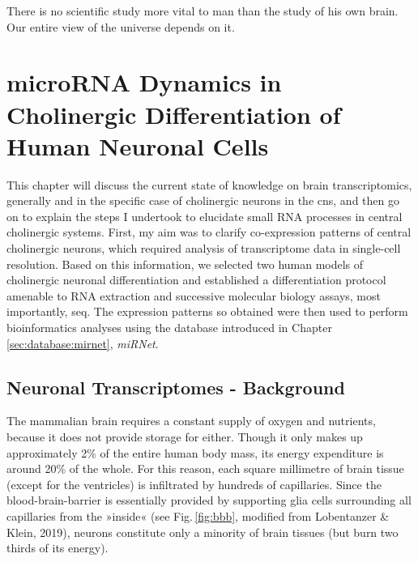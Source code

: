 \begin{savequote}[60mm]
There is no scientific study more vital to man than the study of his own brain. Our entire view of the universe depends on it.
\end{savequote}





\chapter{microRNA Dynamics in Cholinergic Differentiation of Human Neuronal Cells}
 This chapter will discuss the current state of knowledge on brain transcriptomics, generally and in the specific case of cholinergic neurons in the \ac{cns}, and then go on to explain the steps I undertook to elucidate small RNA processes in central cholinergic systems. First, my aim was to clarify co-expression patterns of central cholinergic neurons, which required analysis of transcriptome data in single-cell resolution. Based on this information, we selected two human models of cholinergic neuronal differentiation and established a differentiation protocol amenable to RNA extraction and successive molecular biology assays, most importantly, \ac{seq}. The expression patterns so obtained were then used to perform bioinformatics analyses using the database introduced in Chapter \ref{sec:database:mirnet}, \textit{miRNet}. 

\section{Neuronal Transcriptomes - Background}
The mammalian brain requires a constant supply of oxygen and nutrients, because it does not provide storage for either. Though it only makes up approximately 2\% of the entire human body mass, its energy expenditure is around 20\% of the whole\cite{Raichle2002}. For this reason, each square millimetre of brain tissue (except for the ventricles) is infiltrated by hundreds of capillaries\cite{Bohn2016}. Since the blood-brain-barrier is essentially provided by supporting glia cells surrounding all capillaries from the »inside« (see Fig.\,\ref{fig:bbb}, modified from Lobentanzer \& Klein, 2019\cite{Lobentanzer2019b}), neurons constitute only a minority of brain tissues (but burn two thirds of its energy).


